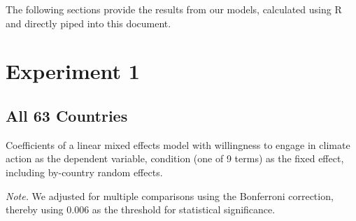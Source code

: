 The following sections provide the results from our models, calculated using R and directly piped into this document.

        \section{Experiment 1}

    \subsection{All 63 Countries}


\begin{table}[H] 
\caption{Coefficients of a linear mixed effects model with willingness to engage in climate action as the dependent variable, condition (one of 9 terms) as the fixed effect, including by-country random effects.}
 
\end{table}
\textit{Note.} We adjusted for multiple comparisons using the Bonferroni correction, thereby using 0.006 as the threshold for statistical significance.

